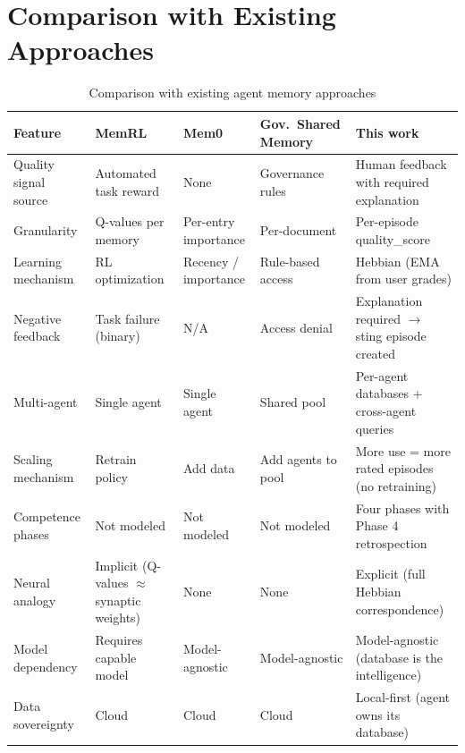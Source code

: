 \documentclass[11pt,a4paper]{article}
\begin{document}
\section{Comparison with Existing Approaches}

\begin{table}[h]
\centering
\small
\begin{tabularx}{\textwidth}{>{\raggedright}p{2.2cm} >{\raggedright}p{2.2cm} >{\raggedright}p{2.2cm} >{\raggedright}p{2.2cm} >{\raggedright\arraybackslash}p{3cm}}
\toprule
\textbf{Feature} & \textbf{MemRL} & \textbf{Mem0} & \textbf{Gov.\ Shared Memory} & \textbf{This work} \\
\midrule
Quality signal source & Automated task reward & None & Governance rules & Human feedback with required explanation \\
\addlinespace
Granularity & Q-values per memory & Per-entry importance & Per-document & Per-episode quality\_score \\
\addlinespace
Learning mechanism & RL optimization & Recency / importance & Rule-based access & Hebbian (EMA from user grades) \\
\addlinespace
Negative feedback & Task failure (binary) & N/A & Access denial & Explanation required $\rightarrow$ sting episode created \\
\addlinespace
Multi-agent & Single agent & Single agent & Shared pool & Per-agent databases + cross-agent queries \\
\addlinespace
Scaling mechanism & Retrain policy & Add data & Add agents to pool & More use = more rated episodes (no retraining) \\
\addlinespace
Competence phases & Not modeled & Not modeled & Not modeled & Four phases with Phase 4 retrospection \\
\addlinespace
Neural analogy & Implicit (Q-values $\approx$ synaptic weights) & None & None & Explicit (full Hebbian correspondence) \\
\addlinespace
Model dependency & Requires capable model & Model-agnostic & Model-agnostic & Model-agnostic (database is the intelligence) \\
\addlinespace
Data sovereignty & Cloud & Cloud & Cloud & Local-first (agent owns its database) \\
\bottomrule
\end{tabularx}
\caption{Comparison with existing agent memory approaches}
\end{table}
\end{document}
